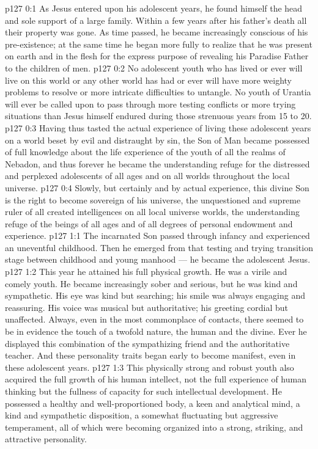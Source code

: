 \author{Midwayer Commission}
\vs p127 0:1 As Jesus entered upon his adolescent years, he found himself the head and sole support of a large family. Within a few years after his father’s death all their property was gone. As time passed, he became increasingly conscious of his pre\hyp{}existence; at the same time he began more fully to realize that he was present on earth and in the flesh for the express purpose of revealing his Paradise Father to the children of men.
\vs p127 0:2 No adolescent youth who has lived or ever will live on this world or any other world has had or ever will have more weighty problems to resolve or more intricate difficulties to untangle. No youth of Urantia will ever be called upon to pass through more testing conflicts or more trying situations than Jesus himself endured during those strenuous years from 15 to 20.
\vs p127 0:3 Having thus tasted the actual experience of living these adolescent years on a world beset by evil and distraught by sin, the Son of Man became possessed of full knowledge about the life experience of the youth of all the realms of Nebadon, and thus forever he became the understanding refuge for the distressed and perplexed adolescents of all ages and on all worlds throughout the local universe.
\vs p127 0:4 Slowly, but certainly and by actual experience, this divine Son is  the right to become sovereign of his universe, the unquestioned and supreme ruler of all created intelligences on all local universe worlds, the understanding refuge of the beings of all ages and of all degrees of personal endowment and experience.
\vs p127 1:1 The incarnated Son passed through infancy and experienced an uneventful childhood. Then he emerged from that testing and trying transition stage between childhood and young manhood --- he became the adolescent Jesus.
\vs p127 1:2 This year he attained his full physical growth. He was a virile and comely youth. He became increasingly sober and serious, but he was kind and sympathetic. His eye was kind but searching; his smile was always engaging and reassuring. His voice was musical but authoritative; his greeting cordial but unaffected. Always, even in the most commonplace of contacts, there seemed to be in evidence the touch of a twofold nature, the human and the divine. Ever he displayed this combination of the sympathizing friend and the authoritative teacher. And these personality traits began early to become manifest, even in these adolescent years.
\vs p127 1:3 This physically strong and robust youth also acquired the full growth of his human intellect, not the full experience of human thinking but the fullness of capacity for such intellectual development. He possessed a healthy and well\hyp{}proportioned body, a keen and analytical mind, a kind and sympathetic disposition, a somewhat fluctuating but aggressive temperament, all of which were becoming organized into a strong, striking, and attractive personality.
